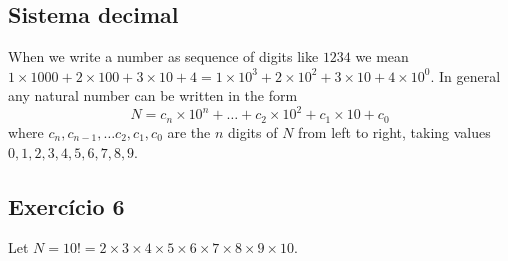 \subsection*{Sistema decimal}

When we write a number as sequence of digits like $1234$ we mean
$ {1 \times 1000} + {2 \times 100} + {3 \times 10} + 4 =
{1 \times 10^3} + {2 \times 10^2} + {3 \times 10} + {4 \times 10^0}$.
In general any natural number can be written in the form
$$N = {c_n \times 10^n} + \dots + {c_2 \times 10^2} + c_1 \times 10 + c_0$$
where $c_n,c_{n-1},\dots c_2,c_1,c_0$ are the $n$ digits of $N$ from left to
right, taking values $0,1,2,3,4,5,6,7,8,9$.

\subsection*{Exercício 6}

Let $N={10!} = 2 \times 3 \times 4 \times 5 \times 6 \times 7
\times 8 \times 9 \times 10$.

